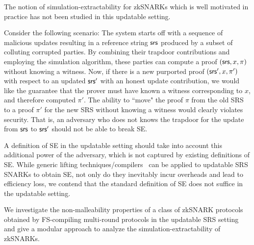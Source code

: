 The notion of simulation-extractability for zkSNARKs which is well motivated in practice has not been studied in this updatable setting.

Consider the following scenario: The system starts off with a sequence of malicious updates resulting in a reference string $\mathsf{srs}$ produced by a subset of colluting corrupted parties. By combining their trapdoor contributions and employing the simulation algorithm, these parties can compute a proof $(\mathsf{srs},x,\pi)$ without knowing a witness. Now, if there is a new purported proof $(\mathsf{srs}',x,\pi')$ with respect to an updated $\mathsf{srs}'$ with an honest update contribution, we would like the guarantee that the prover must have known a witness corresponding to $x$, and therefore computed $\pi'$. The ability to ``move" the proof $\pi$ from the old SRS to a proof $\pi'$ for the new SRS without knowing a witness would clearly violates security. That is, an adversary who does not knows the trapdoor for the update from $\mathsf{srs}$ to $\mathsf{srs}'$ should not be able to break SE. %


A definition of SE in the updatable setting should take into account this additional power of the adversary, which is not captured by existing definitions of SE. 
While generic lifting techniques/compilers~\cite{EPRINT:KZMQCP15,CCS:AbdRamSla20} can be applied to updatable SRS SNARKs to obtain SE, not only do they inevitably incur overheads and lead to efficiency loss, we contend that the standard definition of SE does not suffice in the updatable setting.




We investigate the non-malleability properties of a class of zkSNARK protocols obtained by FS-compiling multi-round protocols in the updatable SRS setting and give a modular approach to analyze the simulation-extractability of zkSNARKs.
